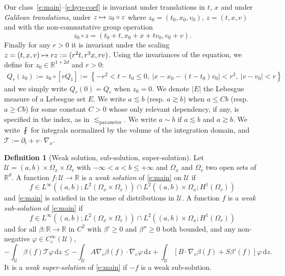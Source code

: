 \documentclass[10pt]{amsart}
\let\mathcal\mathscr
\def\mto{\mathchoice{\longmapsto}{\mapsto}{\mapsto}{\mapsto}}
\theoremstyle{definition}
\newtheorem{definition}[theorem]{Definition}
\theoremstyle{remark}
\newcommand\R{{\mathbb R}}
\newcommand{\cU}{\mathcal{U}}
\newcommand{\cT}{\mathcal T}
\newcommand{\dd}{{\, \mathrm d}}
\begin{document}
Our class~\eqref{e:main}--\eqref{e:hyp-coef} is invariant under
translations in $t$, $x$ and under \emph{Galilean translations},
\ie under $z \mto z_0 \circ z$ where $z_0 =(t_0,x_0,v_0)$,
$z = (t,x,v)$ and with the non-commutative group operation
\begin{equation*}
z_0 \circ z = (t_0+t,x_0+x + t v_0, v_0 + v).
\end{equation*}
Finally for any $r>0$ it is invariant under the scaling
$z=(t,x,v) \mto rz := (r^2t,r^3x,r v)$. Using the invariances of
the equation, we define for $z_0 \in \R^{1+2d}$ and $r>0$:
\begin{align*}
Q_r(z_0) := z_0 \circ \left[ r Q_1 \right]
:= \left\{ -r^2 <t-t_0 \le 0, \ |x - x_0- (t-t_0)v_0|
< r^3, \ |v-v_0| < r \right\}
\end{align*}
and we simply write $Q_r(0)=Q_r$ when $z_0=0$. We denote $|E|$
the Lebesgue measure of a Lebesgue set $E$. We write
$a \lesssim b$ (resp. $a \gtrsim b$) when $a \le Cb$ (resp.
$a \ge Cb$) for some constant $C>0$ whose only relevant
dependency, if any, is specified in the index, as in
$\lesssim_{\text{parameter}}$. We write $a\sim b$ if
$a \lesssim b$ and $a \gtrsim b$. We write $\fint$ for integrals
normalized by the volume of the integration domain, and
$\cT:=\partial_t+v\cdot \nabla_x$.

\skpt
\begin{definition}[Weak solution, sub-solution, super-solution]
\label{d:weak}
Let $\cU = (a,b) \times \Omega_x \times \Omega_v$ with
$-\infty<a < b \le +\infty$ and $\Omega_x$ and $\Omega_v$ two
open sets of $\R^d$. A function $f: \cU \to \R$ is a \emph{weak
solution} of \eqref{e:main} on $\cU$ if
\[
f \in L^\infty ((a,b);L^2 (\Omega_x \times \Omega_v)) \cap L^2
((a,b) \times \Omega_x;H^1(\Omega_v))
\]
and \eqref{e:main} is
satisfied in the sense of distributions in $\cU$. A function
$f$ is a \emph{weak sub-solution} of \eqref{e:main} if
\[
f \in L^\infty ((a,b);L^2 (\Omega_x \times \Omega_v)) \cap L^2
((a,b) \times \Omega_x;H^1(\Omega_v))
\]
and for all
$\beta : \R \to \R$ in $C^2$ with $\beta' \ge 0$ and
$\beta'' \ge 0$ both bounded, and any non-negative
$\varphi \in C^\infty_c (\cU)$,
\begin{equation*}
- \int_\cU \beta(f) \cT \varphi \dd z
\le - \int_{\cU} A \nabla_v \beta(f) \cdot \nabla_v \varphi \dd
z + \int_{\cU} \left[ B \cdot \nabla_v \beta(f)+S \beta'(f)
\right] \varphi \dd z.
\end{equation*}
It is a \emph{weak super-solution} of \eqref{e:main} if $-f$ is
a weak sub-solution.
\end{definition}
\end{document}
